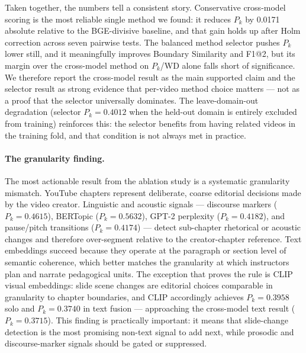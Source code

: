 Taken together, the numbers tell a consistent story. Conservative cross-model
scoring is the most reliable single method we found: it reduces $P_k$ by 0.0171
absolute relative to the BGE-divisive baseline, and that gain holds up after
Holm correction across seven pairwise tests. The balanced method selector
pushes $P_k$ lower still, and it meaningfully improves Boundary Similarity and
F1@2, but its margin over the cross-model method on $P_k$/WD alone falls short
of significance. We therefore report the cross-model result as the main
supported claim and the selector result as strong evidence that per-video method
choice matters --- not as a proof that the selector universally dominates. The
leave-domain-out degradation (selector $P_k=0.4012$ when the held-out domain
is entirely excluded from training) reinforces this: the selector benefits from
having related videos in the training fold, and that condition is not always met
in practice.

\paragraph{The granularity finding.}
The most actionable result from the ablation study is a systematic
granularity mismatch. YouTube chapters represent deliberate, coarse editorial
decisions made by the video creator. Linguistic and acoustic signals ---
discourse markers ($P_k=0.4615$), BERTopic ($P_k=0.5632$), GPT-2 perplexity
($P_k=0.4182$), and pause/pitch transitions ($P_k=0.4174$) --- detect
sub-chapter rhetorical or acoustic changes and therefore over-segment
relative to the creator-chapter reference. Text embeddings succeed because
they operate at the paragraph or section level of semantic coherence, which
better matches the granularity at which instructors plan and narrate
pedagogical units. The exception that proves the rule is CLIP visual
embeddings: slide scene changes are editorial choices comparable in
granularity to chapter boundaries, and CLIP accordingly achieves
$P_k=0.3958$ solo and $P_k=0.3740$ in text fusion --- approaching the
cross-model text result ($P_k=0.3715$). This finding is practically
important: it means that slide-change detection is the most promising
non-text signal to add next, while prosodic and discourse-marker signals
should be gated or suppressed.

